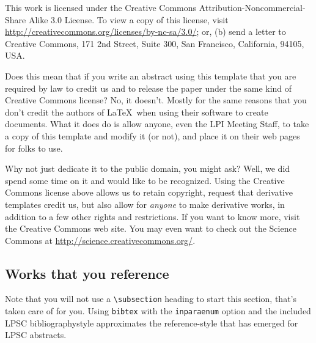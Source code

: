\documentclass[twoside]{article}
\begin{document}
This work is licensed under the Creative Commons Attribution-Noncommercial-Share Alike 3.0 License.
To view a copy of this license, visit \url{http://creativecommons.org/licenses/by-nc-sa/3.0/}; or, (b) send a letter to Creative Commons, 171 2nd Street, Suite 300, San Francisco, California, 94105, USA\@.

Does this mean that if you write an abstract using this template that you are required by law to credit us and to release the paper under the same kind of Creative Commons license?
No, it doesn't.
Mostly for the same reasons that you don't credit the authors of \LaTeX\ when using their software to create documents.
What it does do is allow anyone, even the LPI Meeting Staff, to take a copy of this template and modify it (or not), and place it on their web pages for folks
to use.

Why not just dedicate it to the public domain, you might ask?
Well, we did spend some time on it and would like to be recognized.
Using the Creative Commons license above allows us to retain copyright, request that derivative templates credit us, but also allow for \emph{anyone} to make derivative works, in addition to a few other rights and restrictions.
If you want to know more, visit the Creative Commons web site.
You may even want to check out the Science Commons at \url{http://science.creativecommons.org/}.


\subsection*{Works that you reference}
Note that you will not use a \verb=\subsection= heading to start this section, that's taken care of for you.
Using \texttt{bibtex} with the \texttt{inparaenum} option and the included LPSC bibliographystyle approximates the reference-style that has emerged for LPSC abstracts.

\begin{inparaenum}
  
  \fussy
  \raggedright{}
  
\end{inparaenum}
\end{document}
